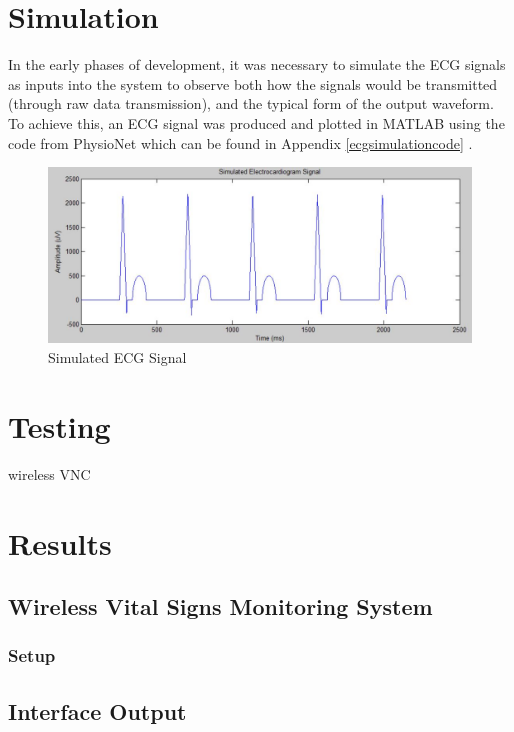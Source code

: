 
\chapter{Simulation}
\label{simulation}

In the early phases of development, it was necessary to simulate the ECG signals as inputs into the system to observe both how the signals would be transmitted (through raw data transmission), and the typical form of the output waveform. To achieve this, an ECG signal was produced and plotted in MATLAB using the code from PhysioNet which can be found in Appendix \ref{ecgsimulationcode} \cite{ecgsimulation}.

\begin{figure}[H]
	\centering
	\includegraphics[width=\linewidth]{ecgsim.jpg}
	\caption{Simulated ECG Signal}
	\label{ecgsim}
\end{figure} 

\chapter{Testing}
wireless VNC

\chapter{Results}

\section{Wireless Vital Signs Monitoring System}

\subsection{Setup}

\section{Interface Output}



